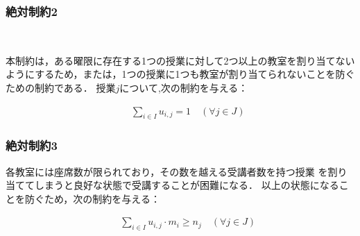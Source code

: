 \documentclass[dvipdfmx,12pt]{beamer}
\begin{document}
\begin{frame}

  \frametitle{\LARGE 絶対制約2}


\\
\vspace{5.0mm}


本制約は，ある曜限に存在する1つの授業に対して2つ以上の教室を割り当てないようにするため，または，1つの授業に1つも教室が割り当てられないことを防ぐための制約である．
授業$j$について,次の制約を与える：


{\Large
\begin{eqnarray}
&&\sum_{i \in I} u_{i,j}=1 \quad \left (\forall j \in J \right)
\end{eqnarray} 
}

\end{frame}




\begin{frame}

  \frametitle{\LARGE 絶対制約3}



\vspace{5.0mm}


各教室には座席数が限られており，その数を越える受講者数を持つ授業
を割り当ててしまうと良好な状態で受講することが困難になる．
以上の状態になることを防ぐため，次の制約を与える：


{\Large
\begin{eqnarray}
&&\sum_{i \in I} u_{i,j}\cdot m_{i} \geq n_{j} \quad \left (\forall j \in J\right)
\end{eqnarray}
}
\end{frame}
\end{document}
